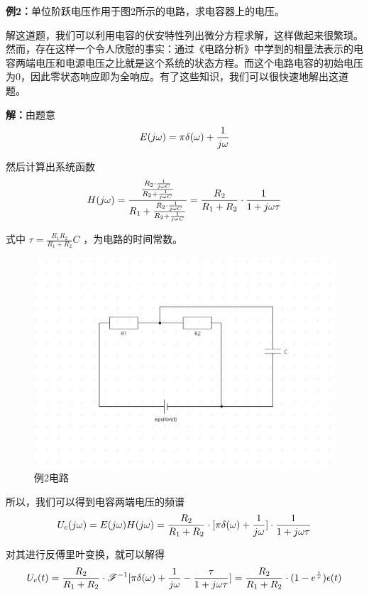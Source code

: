 \documentclass[UTF8,a4paper,11pt]{article}
\begin{document}
\textbf{例2：}单位阶跃电压作用于图2所示的电路，求电容器上的电压。

解这道题，我们可以利用电容的伏安特性列出微分方程求解，这样做起来很繁琐。然而，存在这样一个令人欣慰的事实：通过《电路分析》中学到的相量法表示的电容两端电压和电源电压之比就是这个系统的状态方程。而这个电路电容的初始电压为0，因此零状态响应即为全响应。有了这些知识，我们可以很快速地解出这道题。

\textbf{解：}由题意
\begin{equation}
E(j\omega)=\pi\delta(\omega)+\frac{1}{j\omega}
\notag
\end{equation}

然后计算出系统函数
\begin{equation}
H(j\omega)=\frac{\frac{R_2\cdot\frac{1}{j\omega C}}{R_2+\frac{1}{j\omega C}}}{R_1+\frac{R_2\cdot\frac{1}{j\omega C}}{R_2+\frac{1}{j\omega C}}}=\frac{R_2}{R_1+R_2}\cdot\frac{1}{1+j\omega\tau}
\notag
\end{equation}

式中 $\tau=\frac{R_1R_2}{R_1+R_2}C$ ，为电路的时间常数。
\begin{figure}[htbp]
\centering
\includegraphics[scale=0.1]{c1.png}
\caption{例2电路}
\label{figure}
\end{figure}

所以，我们可以得到电容两端电压的频谱
\begin{equation}
U_c(j\omega)=E(j\omega)H(j\omega)=\frac{R_2}{R_1+R_2}\cdot[\pi\delta(\omega)+\frac{1}{j\omega}]\cdot\frac{1}{1+j\omega\tau}
\notag
\end{equation}

对其进行反傅里叶变换，就可以解得
\begin{equation}
U_c(t)=\frac{R_2}{R_1+R_2}\cdot\mathscr{F}^{-1}[\pi\delta(\omega)+\frac{1}{j\omega}-\frac{\tau}{1+j\omega\tau}]=\frac{R_2}{R_1+R_2}\cdot(1-e^{\frac{t}{\tau}})\epsilon(t)
\notag
\end{equation}
\end{document}
